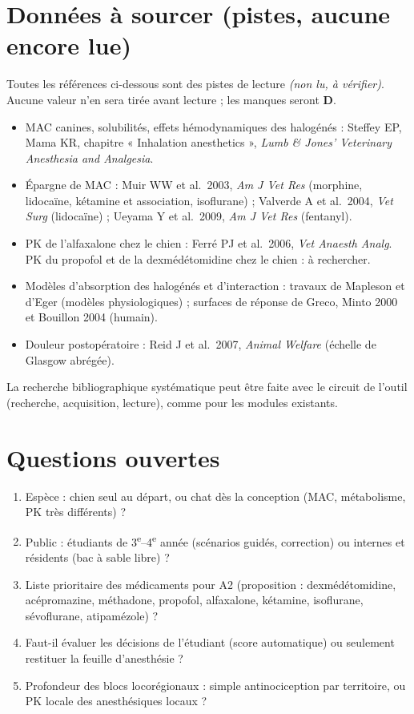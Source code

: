 \documentclass[10pt,a4paper]{article}
\newcommand{\evD}{\textcolor{red!70!black}{\textbf{D}}}
\newcommand{\alire}{\textcolor{red!70!black}{\textsl{(non lu, à vérifier)}}}
\begin{document}
\section{Données à sourcer (pistes, aucune encore lue)}
Toutes les références ci-dessous sont des pistes de lecture \alire. Aucune valeur n'en sera tirée avant lecture ; les manques seront \evD.
\begin{itemize}
\item MAC canines, solubilités, effets hémodynamiques des halogénés : Steffey EP, Mama KR, chapitre « Inhalation anesthetics », \emph{Lumb \& Jones' Veterinary Anesthesia and Analgesia}.
\item Épargne de MAC : Muir WW et al.\ 2003, \emph{Am J Vet Res} (morphine, lidocaïne, kétamine et association, isoflurane) ; Valverde A et al.\ 2004, \emph{Vet Surg} (lidocaïne) ; Ueyama Y et al.\ 2009, \emph{Am J Vet Res} (fentanyl).
\item PK de l'alfaxalone chez le chien : Ferré PJ et al.\ 2006, \emph{Vet Anaesth Analg}. PK du propofol et de la dexmédétomidine chez le chien : à rechercher.
\item Modèles d'absorption des halogénés et d'interaction : travaux de Mapleson et d'Eger (modèles physiologiques) ; surfaces de réponse de Greco, Minto 2000 et Bouillon 2004 (humain).
\item Douleur postopératoire : Reid J et al.\ 2007, \emph{Animal Welfare} (échelle de Glasgow abrégée).
\end{itemize}
La recherche bibliographique systématique peut être faite avec le circuit de l'outil (recherche, acquisition, lecture), comme pour les modules existants.

\section{Questions ouvertes}
\begin{enumerate}
\item Espèce : chien seul au départ, ou chat dès la conception (MAC, métabolisme, PK très différents) ?
\item Public : étudiants de 3\textsuperscript{e}--4\textsuperscript{e} année (scénarios guidés, correction) ou internes et résidents (bac à sable libre) ?
\item Liste prioritaire des médicaments pour A2 (proposition : dexmédétomidine, acépromazine, méthadone, propofol, alfaxalone, kétamine, isoflurane, sévoflurane, atipamézole) ?
\item Faut-il évaluer les décisions de l'étudiant (score automatique) ou seulement restituer la feuille d'anesthésie ?
\item Profondeur des blocs locorégionaux : simple antinociception par territoire, ou PK locale des anesthésiques locaux ?
\end{enumerate}
\end{document}
